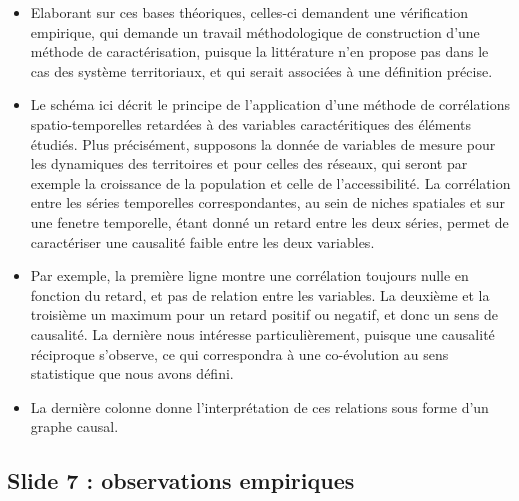 \documentclass[11pt]{article}
\begin{document}
\begin{itemize}
	\item Elaborant sur ces bases théoriques, celles-ci demandent une vérification empirique, qui demande un travail méthodologique de construction d'une méthode de caractérisation, puisque la littérature n'en propose pas dans le cas des système territoriaux, et qui serait associées à une définition précise.
	\item Le schéma ici décrit le principe de l'application d'une méthode de corrélations spatio-temporelles retardées à des variables caractéritiques des éléments étudiés. Plus précisément, supposons la donnée de variables de mesure pour les dynamiques des territoires et pour celles des réseaux, qui seront par exemple la croissance de la population et celle de l'accessibilité. La corrélation entre les séries temporelles correspondantes, au sein de niches spatiales et sur une fenetre temporelle, étant donné un retard entre les deux séries, permet de caractériser une causalité faible entre les deux variables.
	\item Par exemple, la première ligne montre une corrélation toujours nulle en fonction du retard, et pas de relation entre les variables. La deuxième et la troisième un maximum pour un retard positif ou negatif, et donc un sens de causalité. La dernière nous intéresse particulièrement, puisque une causalité réciproque s'observe, ce qui correspondra à une co-évolution au sens statistique que nous avons défini.
	\item La dernière colonne donne l'interprétation de ces relations sous forme d'un graphe causal.
\end{itemize}



\subsection*{Slide 7 : observations empiriques}
\end{document}
